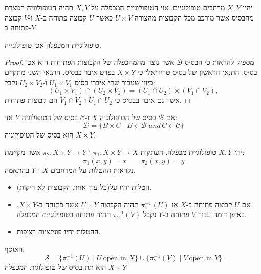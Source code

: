 \documentclass{tstextbook}
\begin{document}
\begin{definition}
יהיו \(X,Y\) מרחבים טופולוגיים. אזי הטופולוגיית המכפלה על \(X,Y\) תהיה הטופולוגיה הנוצרת מהבסיס אשר מורכב מכל הקבוצות מהצורה \(U\times V\) כאשר \(U\) קבוצה פתוחה ב-\(X\) ו-\(V\) קבוצה פתוחה ב-\(Y\).

\end{definition}
\begin{lemma}
טופולוגיית המכפלה אכן טופולוגייה.

\end{lemma}
\begin{proof}
מספיק להראות כי הבסיס \(\mathcal{B}\) אשר נוצר מהמהכפלה של הקבוצות הפתוחות הוא אכן בסיס. התנאי הראשון של בסיס טריוויאלי כי \(X\times Y\) בפרט איבר בבסיס. התנאי השני מתקיים כיוון שעבור שתי איברי בסיס \(U_{1}\times V_{1}\) ו-\(U_{2}\times V_{2}\) נקבל:
$$(U_{1}\times V_{1})\cap(U_{2}\times V_{2})=(U_{1}\cap U_{2})\times(V_{1}\cap V_{2}),$$
אשר גם איבר בבסיס כי \(U_{1}\cap U_{2}\) ו-\(V_{1}\cap V_{2}\) הם קבוצות פתוחות.

\end{proof}
\begin{proposition}
אם \(\mathcal{B}\) בסיס של הטופולוגיה \(X\) ו-\(\mathcal{C}\) בסיס של הטופולוגיה \(Y\) אזי:
$${\mathcal{D}}=\{B\times C\mid B\in{\mathcal{B}}\;a n d\,C\in{\mathcal{C}}\}$$
הוא בסיס של הטופולוגיה \(X\times Y\).

\end{proposition}
\begin{definition}
יהי \(X,Y\) טופולוגיית מכפלה. העתקות \(\pi_{1}:X\times Y\to X\) ו-\(\pi_{2}:X\times Y\to Y\) אשר מקיימת:
$$\pi_{1}(x,y)=x\qquad \pi_{2}(x,y)=y$$
נקראות ההטלות על המרחבים \(X\) ו-\(Y\) בהתאמה.

\end{definition}
\begin{proposition}
  \begin{itemize}
    \item הטלות יהיו על(כל עוד אחת הקבוצות לא ריקות).
    \item אם \(U\) קבוצה פתוחה ב-\(X\) אז \(\pi_{1}^{-1}(U)\) תהיה הקבוצה \(U\times Y\) אשר פתוחה ב-\(X\times Y\). באופן דומה עבור \(V\) פתוחה ב-\(Y\) נקבל \(\pi_{2}^{-1}(V)\) תהיה פתוחה בטופולוגיית המכפלה.
    \item ההטלות יהיו פונקציות רציפות.
  \end{itemize}
\end{proposition}
\begin{proposition}
האוסף:
$${\mathcal{S}}=\{{\pi}_{1}^{-1}(U)\mid U\ \text{open in } X\}\cup\{{\pi}_{2}^{-1}(V)\mid V\ \text{open in } Y\}$$
הוא תת בסיס של טופולוגית המכפלה \(X\times Y\)

\end{proposition}
\end{document}
